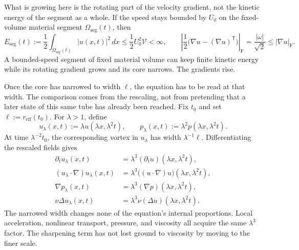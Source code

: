 What is growing here is the rotating part of the velocity gradient, not the kinetic energy of the segment as a whole.
If the speed stays bounded by \(U_0\) on the fixed-volume material segment \(\Omega_{\mathrm{seg}}(t)\), then
\[
  E_{\mathrm{seg}}(t)
  :=
  \frac12\int_{\Omega_{\mathrm{seg}}(t)}|u(x,t)|^2\,dx
  \leq
  \frac12U_0^2\mathcal V
  <
  \infty,
  \qquad
  \left|\frac12\bigl(\nabla u-(\nabla u)^{\mathsf T}\bigr)\right|_{\mathrm F}
  =
  \frac{|\omega|}{\sqrt2}
  \leq
  |\nabla u|_{\mathrm F}.
\]
A bounded-speed segment of fixed material volume can keep finite kinetic energy while its rotating gradient grows and its core narrows.
The gradients rise.


Once the core has narrowed to width \(\ell\), the equation has to be read at that width.
The comparison comes from the \NavierStokes{} rescaling, not from pretending that a later state of this same tube has already been reached.
Fix \(t_0\) and set \(\ell:=r_{\mathrm{eff}}(t_0)\).
For \(\lambda>1\), define
\[
  u_\lambda(x,t)
  :=
  \lambda u(\lambda x,\lambda^2t),
  \qquad
  p_\lambda(x,t)
  :=
  \lambda^2p(\lambda x,\lambda^2t).
\]
At time \(\lambda^{-2}t_0\), the corresponding vortex in \(u_\lambda\) has width \(\lambda^{-1}\ell\).
Differentiating the rescaled fields gives
\[
\begin{aligned}
  \partial_tu_\lambda(x,t)
  &=
  \lambda^3(\partial_tu)(\lambda x,\lambda^2t),
  \\
  (u_\lambda\cdot\nabla)u_\lambda(x,t)
  &=
  \lambda^3\bigl((u\cdot\nabla)u\bigr)(\lambda x,\lambda^2t),
  \\
  \nabla p_\lambda(x,t)
  &=
  \lambda^3(\nabla p)(\lambda x,\lambda^2t),
  \\
  \nu\Delta u_\lambda(x,t)
  &=
  \lambda^3\nu(\Delta u)(\lambda x,\lambda^2t).
\end{aligned}
\]
The narrowed width changes none of the equation's internal proportions.
Local acceleration, nonlinear transport, pressure, and viscosity all acquire the same \(\lambda^3\) factor.
The sharpening term has not lost ground to viscosity by moving to the finer scale.


